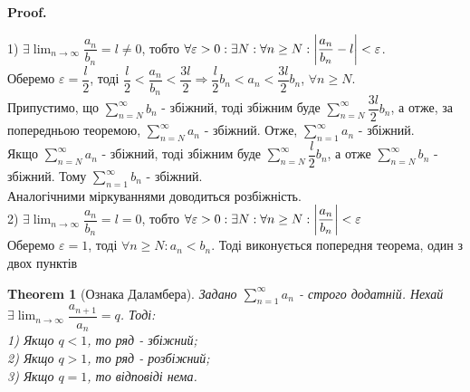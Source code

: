 \documentclass[a4paper, 10pt]{article}
\makeatletter
\def\huge{\displaystyle}
\def\qed{$\blacksquare$}
\theoremstyle{theoremdd}
\newtheorem{theorem}{Theorem}[subsection]
\theoremstyle{theoremdd}
\theoremstyle{theoremdd}
\theoremstyle{theoremdd}
\theoremstyle{theoremdd}
\theoremstyle{theoremdd}
\theoremstyle{theoremdd}
\theoremstyle{theoremdd}
\renewenvironment{proof}[1][Proof.\\]{\par
\pushQED{\hfill \qed}%
\normalfont \topsep6\p@\@plus6\p@\relax
\trivlist
\item\relax
{\bfseries
#1\@addpunct{.}}\hspace\labelsep\ignorespaces
}{%
\popQED\endtrivlist\@endpefalse
}
\makeatother
\begin{document}
\begin{proof}
1) $\exists \huge \lim_{n \to \infty} \dfrac{a_n}{b_n} = l \neq 0$, тобто $\forall \varepsilon > 0: \exists N: \forall n \geq N: \abs{\dfrac{a_n}{b_n}-l} < \varepsilon$.\\
Оберемо $\varepsilon = \dfrac{l}{2}$, тоді $\dfrac{l}{2} < \dfrac{a_n}{b_n} < \dfrac{3l}{2} \Rightarrow \dfrac{l}{2}b_n < a_n < \dfrac{3l}{2} b_n$, $\forall n \geq N$.\\
Припустимо, що $\huge \sum_{n=N}^{\infty} b_n$ - збіжний, тоді збіжним буде $\huge \sum_{n=N}^{\infty} \dfrac{3l}{2} b_n$, а отже, за попередньою теоремою, $\huge \sum_{n=N}^{\infty} a_n$ - збіжний. Отже, $\huge\sum_{n=1}^\infty a_n$ - збіжний.\\
Якщо $\huge\sum_{n = N}^\infty a_n$ - збіжний, тоді збіжним буде $\huge\sum_{n = N}^\infty \dfrac{l}{2} b_n$, а отже $\huge\sum_{n=N}^\infty b_n$ - збіжний. Тому $\huge\sum_{n=1}^\infty b_n$ - збіжний.\\
Аналогічними міркуваннями доводиться розбіжність.
\bigskip \\
2) $\exists \huge \lim_{n \to \infty} \dfrac{a_n}{b_n} = l = 0$, тобто $\forall \varepsilon > 0: \exists N: \forall n \geq N: \abs{\dfrac{a_n}{b_n}} < \varepsilon$\\
Оберемо $\varepsilon = 1$, тоді $\forall n \geq N: a_n < b_n$. Тоді виконується попередня теорема, один з двох пунктів
\end{proof}

\begin{theorem}[Ознака Даламбера]
Задано $\huge \sum_{n=1}^{\infty} a_n$ - строго додатній. Нехай $\exists \huge \lim_{n \to \infty} \dfrac{a_{n+1}}{a_n} = q$. Тоді:\\
1) Якщо $q<1$, то ряд - збіжний;\\
2) Якщо $q>1$, то ряд - розбіжний;\\
3) Якщо $q=1$, то відповіді нема.
\end{theorem}
\end{document}
